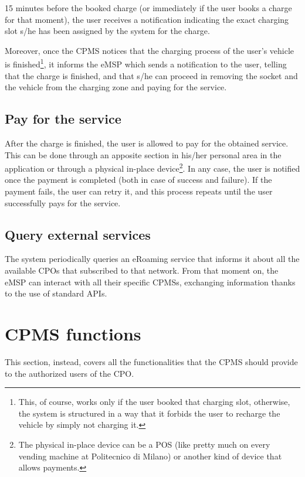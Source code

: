 15 minutes before the booked charge (or immediately if the user books a charge for that moment), the user receives a notification indicating the exact charging slot s/he has been assigned by the system for the charge.\medskip

Moreover, once the CPMS notices that the charging process of the user's vehicle is finished\footnote{This, of course, works only if the user booked that charging slot, otherwise, the system is structured in a way that it forbids the user to recharge the vehicle by simply not charging it.}, it informs the eMSP which sends a notification to the user, telling that the charge is finished, and that s/he can proceed in removing the socket and the vehicle from the charging zone and paying for the service.

\vfill

\subsection{Pay for the service}

After the charge is finished, the user is allowed to pay for the obtained service. This can be done through an apposite section in his/her personal area in the application or through a physical in-place device\footnote{The physical in-place device can be a POS (like pretty much on every vending machine at Politecnico di Milano) or another kind of device that allows payments.}. In any case, the user is notified once the payment is completed (both in case of success and failure). If the payment fails, the user can retry it, and this process repeats until the user successfully pays for the service.

\subsection{Query external services}

The system periodically queries an eRoaming service that informs it about all the available CPOs that subscribed to that network. From that moment on, the eMSP can interact with all their specific CPMSs, exchanging information thanks to the use of standard APIs.

\section{CPMS functions}

This section, instead, covers all the functionalities that the CPMS should provide to the authorized users of the CPO.

